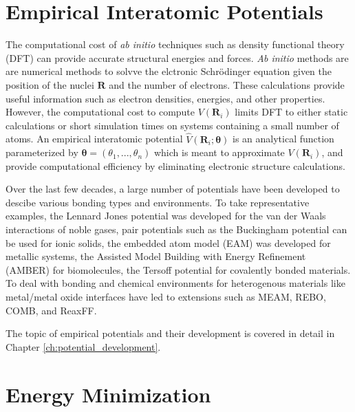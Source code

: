 \section{Empirical Interatomic Potentials}
The computational cost of \emph{ab initio} techniques such as density functional theory (DFT)\cite{hohenberg1964_dft,kohn1965_dft} can provide accurate structural energies and forces.    \emph{Ab initio} methods are are numerical methods to solvve the elctronic Schr\"odinger equation given the position of the nuclei $\bm{R}$ and the number of electrons.  These calculations provide useful information such as electron densities, energies, and other properties. However, the computational cost to compute $V(\bm{R}_i)$  limits DFT to either static calculations or short simulation times on systems containing a small number of atoms.
An empirical interatomic potential $\hat{V}(\bm{R}_i;\bm{\theta})$ is an analytical function parameterized by $\bm{\theta}=(\theta_1,...,\theta_n)$ which is meant to approximate $V(\bm{R}_i)$, and provide computational efficiency by eliminating electronic structure calculations.

Over the last few decades, a large number of potentials have been developed to descibe various bonding types and environments.
To take representative examples, the Lennard Jones potential\cite{lennardjones1924_lj_pot} was developed for the van der Waals interactions of noble gases, pair potentials such as the Buckingham potential\cite{buckingham1938} can be used for ionic solids\cite{catlow1977_buckingham}, the embedded atom model (EAM)\cite{daw1983_eam,daw1984_eam} was developed for metallic systems,
the Assisted Model Building with Energy Refinement (AMBER)\cite{cornell1995_potential_amber} for biomolecules,
the Tersoff potential\cite{tersoff1988_potential_1,tersoff1988_potential_2} for covalently bonded materials.
To deal with bonding and chemical environments for heterogenous materials like metal/metal oxide interfaces have led to extensions such as MEAM\cite{baskes1992_potential_meam},  REBO\cite{brenner1990_potential_rebo},  COMB\cite{liang2003_potential_comb},
and ReaxFF\cite{vanduin2001_reaxff}.

The topic of empirical potentials and their development is covered in detail in Chapter \ref{ch:potential_development}.

\section{Energy Minimization}

